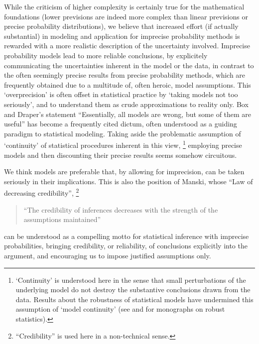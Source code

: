 While the criticism of higher complexity is certainly true for the mathematical foundations
(lower previsions are indeed more complex than linear previsions or precise probability distributions),
we believe that increased effort (if actually substantial) in modeling and application 
for imprecise probability methods
is rewarded with a more realistic description of the uncertainty involved.
Imprecise probability models lead to more reliable conclusions,
by explicitely communicating the uncertainties inherent in the model or the data,
in contrast to the often seemingly precise results from precise probability methods,
which are frequently obtained due to a multitude of, often heroic, model assumptions. %
This `overprecision' is often offset in statistical practice by `taking models not too seriously',
and to understand them as crude approximations to reality only.
Box and Draper's statement ``Essentially, all models are wrong, but some of them are useful'' \parencite[p.~424]{1987:box}
has become a frequently cited dictum, often understood as a guiding paradigm to statistical modeling.
Taking aside the problematic assumption of `continuity' of statistical procedures inherent in this view,%
\footnote{`Continuity' is understood here in the sense that small perturbations of the underlying model
do not destroy the substantive conclusions drawn from the data.
Results about the robustness of statistical models have undermined this assumption of `model continuity'
(see \textcite{1981:huber} and \textcite{1986:hampel} for monographs on robust statistics).}
employing precise models and then discounting their precise results
seems somehow circuitous.

We think models are preferable that, by allowing for imprecision, can be taken seriously in their implications.
This is also the position of Manski, whose ``Law of decreasing credibility'',%
\footnote{``Credibility'' is used here in a non-technical sense.}
\begin{quote}
``The credibility of inferences decreases with the strength of the assumptions maintained'' \parencite[p. 1]{2003:manski}
\end{quote}
can be understood as a compelling motto for statistical inference with imprecise probabilities,
bringing credibility, or reliability, of conclusions explicitly into the argument,
and encouraging us to impose justified assumptions only.


